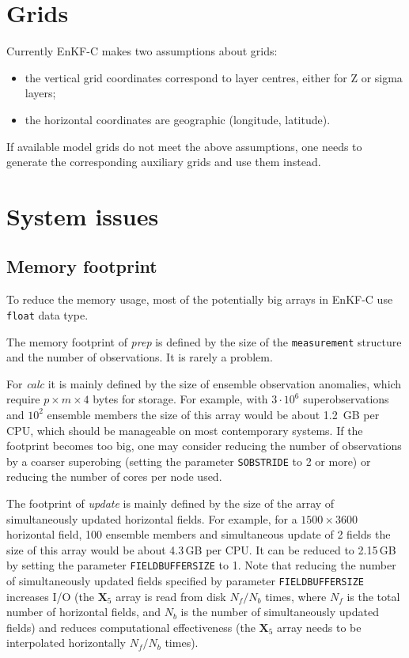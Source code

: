 \documentclass[11pt]{report}
\newcommand{\mb} {\mathbf}
\begin{document}
\section{Grids}

Currently EnKF-C makes two assumptions about grids:
\begin{itemize}
\item the vertical grid coordinates correspond to layer centres, either for Z or sigma layers;
\item the horizontal coordinates are geographic (longitude, latitude).
\end{itemize}

If available model grids do not meet the above assumptions, one needs to generate the corresponding auxiliary grids and use them instead.

\section{System issues}

\subsection{Memory footprint}

To reduce the memory usage, most of the potentially big arrays in EnKF-C use \verb|float| data type.

The memory footprint of \emph{prep} is defined by the size of the \verb|measurement| structure and the number of observations.
It is rarely a problem.

For \emph{calc} it is mainly defined by the size of ensemble observation anomalies, which require $p \times m \times 4$ bytes for storage.
For example, with $3 \cdot 10^6$ superobservations and $10^2$ ensemble members the size of this array would be about 1.2\, GB per CPU, which should be manageable on most contemporary systems.
If the footprint becomes too big, one may consider reducing the number of observations by a coarser superobing (setting the parameter \verb|SOBSTRIDE| to 2 or more) or reducing the number of cores per node used.

The footprint of \emph{update} is mainly defined by the size of the array of simultaneously updated horizontal fields.
For example, for a $1500 \times 3600$ horizontal field, 100 ensemble members and simultaneous update of 2 fields the size of this array would be about 4.3\,GB per CPU.
It can be reduced to 2.15\,GB by setting the parameter \verb|FIELDBUFFERSIZE| to 1.
Note that reducing the number of simultaneously updated fields specified by parameter \verb|FIELDBUFFERSIZE| increases I/O (the $\mb X_5$ array is read from disk $N_f / N_b$ times, where $N_f$ is the total number of horizontal fields, and $N_b$ is the number of simultaneously updated fields) and reduces computational effectiveness (the $\mb X_5$ array needs to be interpolated horizontally $N_f / N_b$ times).
\end{document}
